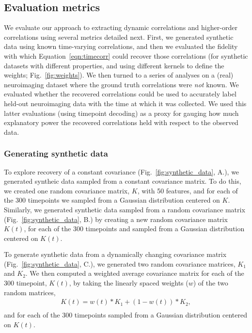 \documentclass[english]{article}
\begin{document}
\subsection*{Evaluation metrics}
We evaluate our approach to extracting dynamic correlations and
higher-order correlations using several metrics detailed next.  First,
we generated synthetic data using known time-varying correlations, and
then we evaluated the fidelity with which Equation~\ref{eqn:timecorr}
could recover those correlations (for synthetic datasets with
different properties, and using different kernels to define the
weights; Fig.~\ref{fig:weights}).  We then turned to a series of
analyses on a (real) neuroimaging dataset where the ground truth
correlations were \textit{not} known.  We evaluated whether the
recovered correlations could be used to accurately label held-out
neuroimaging data with the time at which it was collected.  We used this latter evaluations (using timepoint
decoding) as a proxy for
gauging how much explanatory power the recovered correlations held
with respect to the observed data.

\subsubsection*{Generating synthetic data}
To explore recovery of a constant covariance (Fig.~\ref{fig:synthetic_data},  A.), we generated syntheic
data sampled from a constant covariance matrix. To do this, we created one random
covariance matrix, $K$, with 50 features, and for each of the 300 timepoints  we
sampled from a Gaussian distribution centered on $K$.  Similarly, we generated synthetic data
sampled from a random covariance matrix (Fig.~\ref{fig:synthetic_data},  B.) by creating a new random
covariance matrix $K(t)$, for each of the 300 timepoints and sampled from a
Gaussian distribution centered on $K(t)$.

To generate synthetic data from a dynamically changing covariance
matrix (Fig.~\ref{fig:synthetic_data},  C.),
we generated two random covariance
matrices, $K_{1}$ and $K_{2}$.  We then computed a weighted average covariance matrix
for each of the 300 timepoint, $K(t)$, 
by taking the linearly spaced weights ($w$) of the two random matrices, 
\begin{align}
K(t) = w(t) * K_{1} + (1 - w(t)) *  K_{2}, \\\label{eqn:ramping}
\end{align}
and for each of the 300 timepoints sampled from a
Gaussian distribution centered on $K(t)$.
\end{document}
